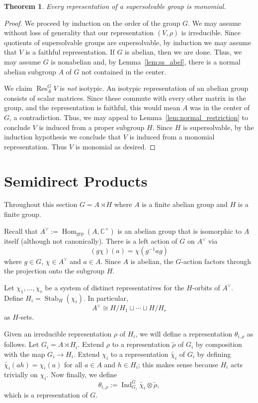 \documentclass[12pt]{article}
\theoremstyle{plain}
\newtheorem{theorem}{Theorem}[section]
\theoremstyle{definition}
\theoremstyle{remark}
\numberwithin{equation}{section}
\begin{document}
\begin{theorem} \label{thm:ss_monomial}
Every representation of a supersolvable group is monomial.
\end{theorem}

\begin{proof}
We proceed by induction on the order of the group $G$.
We may assume without loss of generality that our representation
$(V,\rho)$ is irreducible.
Since quotients of supersolvable groups are supersolvable,
by induction we may assume that $V$ is a faithful representation.
If $G$ is abelian, then we are done.
Thus, we may assume $G$ is nonabelian and, by Lemma~\ref{lem:ss_abel},
there is a normal abelian subgroup $A$ of $G$ not contained in the center.

We claim $\operatorname{Res}^G_A V$ is \emph{not} isotypic.
An isotypic representation of an abelian group consists of scalar
matrices.  Since these commute with every other matrix in the group,
and the representation is faithful, this would mean $A$ was in the center
of $G$, a contradiction.
Thus, we may appeal to Lemma~\ref{lem:normal_restriction}
to conclude $V$ is induced from a proper subgroup $H$.
Since $H$ is supersolvable, by the induction hypothesis we conclude that
$V$ is induced from a monomial representation.
Thus $V$ is monomial as desired.
\end{proof}

\section{Semidirect Products}

Throughout this section $G = A \rtimes H$
where $A$ is a finite abelian group and $H$ is a finite group.

Recall that $A^\vee :=
\operatorname{Hom}_{\mathrm{grp}}(A,\mathbb{C}^\times)$
is an abelian group that is isomorphic to $A$ itself (although not
canonically).
There is a left action of $G$ on $A^\vee$ via
\[
(g\chi)(a)=\chi(g^{-1}ag)
\]
where $g \in G$, $\chi \in A^\vee$ and $a \in A$.
Since $A$ is abelian, the $G$-action factors through the projection
onto the subgroup $H$.

Let $\chi_1,\ldots, \chi_r$ be a system of distinct representatives
for the $H$-orbits of $A^\vee$.  Define
$H_i=\operatorname{Stab}_H(\chi_i)$.
In particular,
\[
A^\vee \cong H/H_1 \sqcup \cdots \sqcup H/H_r
\]
as $H$-sets.

Given an irreducible representation $\rho$ of $H_i$,
we will define a representation $\theta_{i,\rho}$ as follows.
Let $G_i= A \rtimes H_i$.
Extend $\rho$ to a representation $\widetilde{\rho}$ of $G_i$
by composition with the map $G_i \to H_i$.
Extend $\chi_i$ to a representation $\widetilde{\chi_i}$ of $G_i$
by defining $\widetilde{\chi_i}(ah)=\chi_i(a)$
for all $a \in A$ and $h \in H_i$; this makes sense because
$H_i$ acts trivially on $\chi_i$.
Now finally, we define
\[
\theta_{i,\rho} := \operatorname{Ind}_{G_i}^G
\widetilde{\chi_i} \otimes \widetilde{\rho},
\]
which is a representation of $G$.
\end{document}
